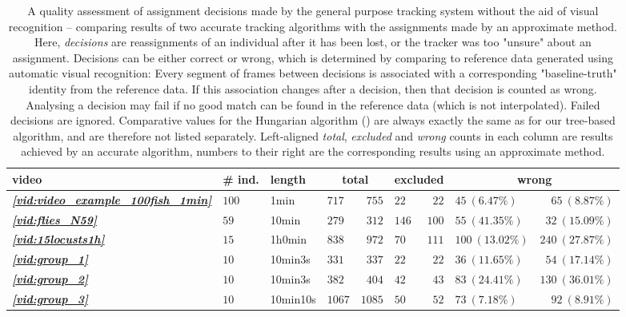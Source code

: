 \documentclass[9pt,lineno]{elife}
\newcommand{\vidref}[1]{\textit{\textbf{\ref{#1}}}}
\begin{document}
\begin{table}
\caption{\label{tab:decisions}A quality assessment of assignment decisions made by the general purpose tracking system without the aid of visual recognition -- comparing results of two accurate tracking algorithms with the assignments made by an approximate method. Here, \textit{decisions} are reassignments of an individual after it has been lost, or the tracker was too "unsure" about an assignment. Decisions can be either correct or wrong, which is determined by comparing to reference data generated using automatic visual recognition: Every segment of frames between decisions is associated with a corresponding "baseline-truth" identity from the reference data. If this association changes after a decision, then that decision is counted as wrong. Analysing a decision may fail if no good match can be found in the reference data (which is not interpolated). Failed decisions are ignored. Comparative values for the Hungarian algorithm (\cite{kuhn1955hungarian}) are always exactly the same as for our tree-based algorithm, and are therefore not listed separately.
Left-aligned \textit{total}, \textit{excluded} and \textit{wrong} counts in each column are results achieved by an accurate algorithm, numbers to their right are the corresponding results using an approximate method.}
\begin{tabular}{l l l || l r | l r | l r }
\toprule
video & {\# ind.} & length & \multicolumn{2}{c|}{total} & \multicolumn{2}{c|}{excluded}  & \multicolumn{2}{c}{wrong} \\
\midrule
\vidref{vid:video_example_100fish_1min} & $ 100 $ &  1min  & $ 717 $ & $ 755 $ & $ 22 $ & $ 22 $ & $ 45 \ ( 6.47 \%)$ & $ 65 \ ( 8.87 \%)$\\
\vidref{vid:flies_N59} & $ 59 $ &  10min  & $ 279 $ & $ 312 $ & $ 146 $ & $ 100 $ & $ 55 \ ( 41.35 \%)$ & $ 32 \ ( 15.09 \%)$\\
\vidref{vid:15locusts1h} & $ 15 $ &  1h0min  & $ 838 $ & $ 972 $ & $ 70 $ & $ 111 $ & $ 100 \ ( 13.02 \%)$ & $ 240 \ ( 27.87 \%)$\\
\vidref{vid:group_1} & $ 10 $ &  10min3s  & $ 331 $ & $ 337 $ & $ 22 $ & $ 22 $ & $ 36 \ ( 11.65 \%)$ & $ 54 \ ( 17.14 \%)$\\
\vidref{vid:group_2} & $ 10 $ &  10min3s  & $ 382 $ & $ 404 $ & $ 42 $ & $ 43 $ & $ 83 \ ( 24.41 \%)$ & $ 130 \ ( 36.01 \%)$\\
\vidref{vid:group_3} & $ 10 $ &  10min10s  & $ 1067 $ & $ 1085 $ & $ 50 $ & $ 52 $ & $ 73 \ ( 7.18 \%)$ & $ 92 \ ( 8.91 \%)$\\

\end{tabular}
\end{table}
\end{document}
